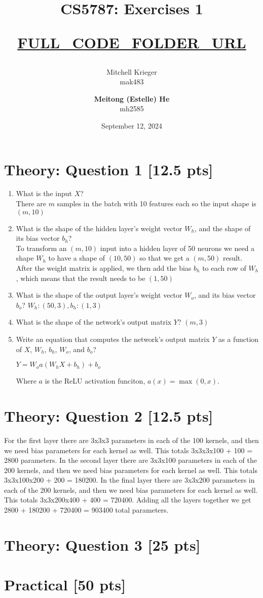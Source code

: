 \documentclass{article}
\title{CS5787: Exercises 1 \\ \begin{small}\url{FULL_CODE_FOLDER_URL}\end{small}}
\author{Mitchell Krieger \\ mak483 \and \textbf{Meitong (Estelle) He} \\ mh2585}
\date{September 12, 2024}
\begin{document}
\maketitle

\section{Theory: Question 1 [12.5 pts]}

\begin{enumerate}[label=\alph*)]
    \item What is the input $X$? \\ There are $m$ samples in the batch with 10 features each so the input shape is $(m, 10)$ 
    \item What is the shape of the hidden layer's weight vector $W_h$, and the shape of its bias vector $b_h$? \\ To transform an $(m, 10)$ input into a hidden layer of 50 neurons we need a shape $W_h$ to have a shape of $(10, 50)$ so that we get a $(m, 50)$ result. After the weight matrix is applied, we then add the bias $b_h$ to each row of $W_h$, which means that the result needs to be $(1, 50)$
    \item What is the shape of the output layer's weight vector $W_o$, and its bias vector $b_o$? $W_h: (50, 3), b_h: (1, 3)$
    \item What is the shape of the network's output matrix $Y$? $(m, 3)$
    \item Write an equation that computes the network's output matrix $Y$ as a function of $X$, $W_h$, $b_h$, $W_o$, and $b_o$?
    
          $Y = W_oa(W_hX+b_h)+b_o$ 

          Where $a$ is the ReLU activation funciton, $a(x) = \max(0,x)$.
\end{enumerate}

\section{Theory: Question 2 [12.5 pts]}

For the first layer there are 3x3x3 parameters in each of the 100 kernels, and then we need bias parameters for each kernel as well. This totals 3x3x3x100 + 100 = 2800 parameters.
In the second layer there are 3x3x100 parameters in each of the 200 kernels, and then we need bias parameters for each kernel as well. This totals 3x3x100x200 + 200 = 180200.
In the final layer there are 3x3x200 parameters in each of the 200 kernels, and then we need bias parameters for each kernel as well. This totals 3x3x200x400 + 400 = 720400.
Adding all the layers together we get 2800 + 180200 + 720400 = 903400 total parameters.

\section{Theory: Question 3 [25 pts]}

\section{Practical [50 pts]}
\end{document}
